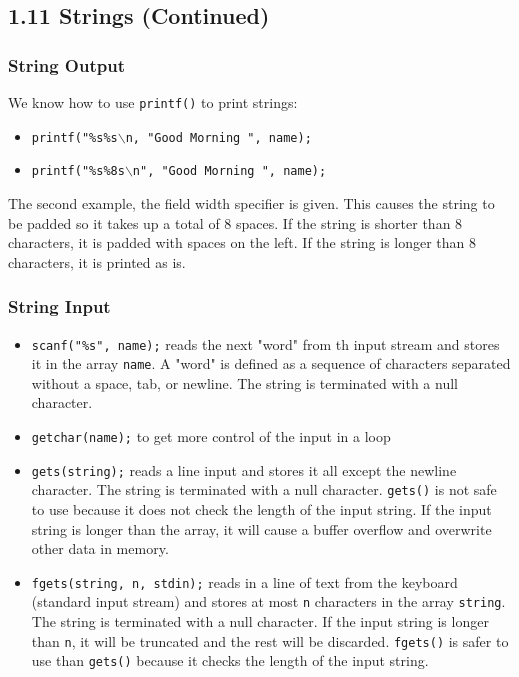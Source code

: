 \documentclass[a4paper, 10pt]{article}
\begin{document}
\subsection*{1.11 Strings (Continued)}
\subsubsection{String Output}
We know how to use \texttt{printf()} to print strings:
\begin{itemize}
    \item \texttt{printf("\%s\%s$\backslash$n, "Good Morning ", name);}
    \item \texttt{printf("\%s\%8s$\backslash$n", "Good Morning ", name);}
\end{itemize}
The second example, the field width specifier is given. This causes the string to be padded so it takes up a total of 8 spaces. If the string is shorter than 8 characters, it is padded with spaces on the left. If the string is longer than 8 characters, it is printed as is.

\subsubsection{String Input}
\begin{itemize}
    \item \texttt{scanf("\%s", name);} reads the next "word" from th input stream and stores it in the array \texttt{name}. A "word" is defined as a sequence of characters separated without a space, tab, or newline. The string is terminated with a null character.
    \item \texttt{getchar(name);} to get more control of the input in a loop
    \item \texttt{gets(string);} reads a line input and stores it all except the newline character. The string is terminated with a null character. \texttt{gets()} is not safe to use because it does not check the length of the input string. If the input string is longer than the array, it will cause a buffer overflow and overwrite other data in memory.
    \item \texttt{fgets(string, n, stdin);} reads in a line of text from the keyboard (standard input stream) and stores at most \texttt{n} characters in the array \texttt{string}. The string is terminated with a null character. If the input string is longer than \texttt{n}, it will be truncated and the rest will be discarded. \texttt{fgets()} is safer to use than \texttt{gets()} because it checks the length of the input string.
\end{itemize}
\end{document}
